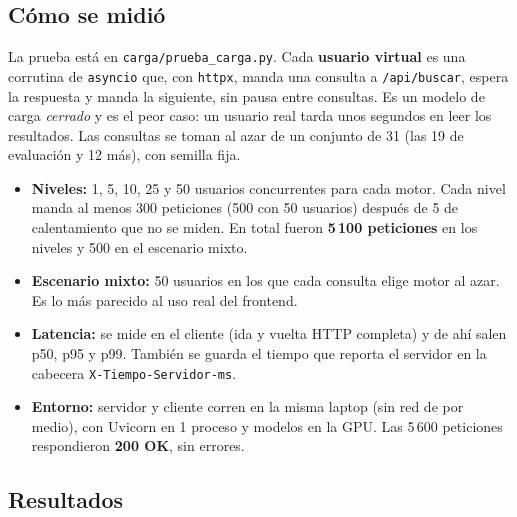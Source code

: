 \documentclass[11pt,letterpaper]{article}
\newcommand{\term}[1]{\texttt{#1}}
\begin{document}
\subsection{Cómo se midió}

La prueba está en \term{carga/prueba\_carga.py}. Cada \textbf{usuario virtual} es una corrutina de \term{asyncio} que, con \term{httpx}, manda una consulta a \term{/api/buscar}, espera la respuesta y manda la siguiente, sin pausa entre consultas. Es un modelo de carga \emph{cerrado} y es el peor caso: un usuario real tarda unos segundos en leer los resultados. Las consultas se toman al azar de un conjunto de 31 (las 19 de evaluación y 12 más), con semilla fija.
\begin{itemize}[nosep]
\item \textbf{Niveles:} 1, 5, 10, 25 y 50 usuarios concurrentes para cada motor. Cada nivel manda al menos 300 peticiones (500 con 50 usuarios) después de 5 de calentamiento que no se miden. En total fueron \textbf{5\,100 peticiones} en los niveles y 500 en el escenario mixto.
\item \textbf{Escenario mixto:} 50 usuarios en los que cada consulta elige motor al azar. Es lo más parecido al uso real del frontend.
\item \textbf{Latencia:} se mide en el cliente (ida y vuelta HTTP completa) y de ahí salen p50, p95 y p99. También se guarda el tiempo que reporta el servidor en la cabecera \term{X-Tiempo-Servidor-ms}.
\item \textbf{Entorno:} servidor y cliente corren en la misma laptop (sin red de por medio), con Uvicorn en 1 proceso y modelos en la GPU. Las 5\,600 peticiones respondieron \textbf{200 OK}, sin errores.
\end{itemize}

\subsection{Resultados}
\end{document}

